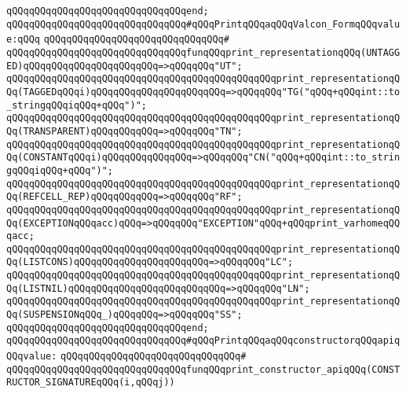 \verb|qQQqqQQqqQQqqQQqqQQqqQQqqQQqqQQqend;|\newline
\newline
\newline
\verb|qQQqqQQqqQQqqQQqqQQqqQQqqQQqqQQq#qQQqPrintqQQqaqQQqValcon_FormqQQqvalue:qQQq|\newline
\verb|qQQqqQQqqQQqqQQqqQQqqQQqqQQqqQQq#|\newline
\verb|qQQqqQQqqQQqqQQqqQQqqQQqqQQqqQQqfunqQQqprint_representationqQQq(UNTAGGED)qQQqqQQqqQQqqQQqqQQqqQQq=>qQQqqQQq"UT";|\newline
\verb|qQQqqQQqqQQqqQQqqQQqqQQqqQQqqQQqqQQqqQQqqQQqqQQqprint_representationqQQq(TAGGEDqQQqi)qQQqqQQqqQQqqQQqqQQqqQQq=>qQQqqQQq"TG("qQQq+qQQqint::to_stringqQQqiqQQq+qQQq")";|\newline
\verb|qQQqqQQqqQQqqQQqqQQqqQQqqQQqqQQqqQQqqQQqqQQqqQQqprint_representationqQQq(TRANSPARENT)qQQqqQQqqQQq=>qQQqqQQq"TN";|\newline
\verb|qQQqqQQqqQQqqQQqqQQqqQQqqQQqqQQqqQQqqQQqqQQqqQQqprint_representationqQQq(CONSTANTqQQqi)qQQqqQQqqQQqqQQq=>qQQqqQQq"CN("qQQq+qQQqint::to_stringqQQqiqQQq+qQQq")";|\newline
\verb|qQQqqQQqqQQqqQQqqQQqqQQqqQQqqQQqqQQqqQQqqQQqqQQqprint_representationqQQq(REFCELL_REP)qQQqqQQqqQQq=>qQQqqQQq"RF";|\newline
\verb|qQQqqQQqqQQqqQQqqQQqqQQqqQQqqQQqqQQqqQQqqQQqqQQqprint_representationqQQq(EXCEPTIONqQQqacc)qQQq=>qQQqqQQq"EXCEPTION"qQQq+qQQqprint_varhomeqQQqacc;|\newline
\verb|qQQqqQQqqQQqqQQqqQQqqQQqqQQqqQQqqQQqqQQqqQQqqQQqprint_representationqQQq(LISTCONS)qQQqqQQqqQQqqQQqqQQqqQQq=>qQQqqQQq"LC";|\newline
\verb|qQQqqQQqqQQqqQQqqQQqqQQqqQQqqQQqqQQqqQQqqQQqqQQqprint_representationqQQq(LISTNIL)qQQqqQQqqQQqqQQqqQQqqQQqqQQq=>qQQqqQQq"LN";|\newline
\verb|qQQqqQQqqQQqqQQqqQQqqQQqqQQqqQQqqQQqqQQqqQQqqQQqprint_representationqQQq(SUSPENSIONqQQq_)qQQqqQQq=>qQQqqQQq"SS";|\newline
\verb|qQQqqQQqqQQqqQQqqQQqqQQqqQQqqQQqend;|\newline
\newline
\newline
\verb|qQQqqQQqqQQqqQQqqQQqqQQqqQQqqQQq#qQQqPrintqQQqaqQQqconstructorqQQqapiqQQqvalue:|\newline
\verb|qQQqqQQqqQQqqQQqqQQqqQQqqQQqqQQq#|\newline
\verb|qQQqqQQqqQQqqQQqqQQqqQQqqQQqqQQqfunqQQqprint_constructor_apiqQQq(CONSTRUCTOR_SIGNATUREqQQq(i,qQQqj))|\newline
